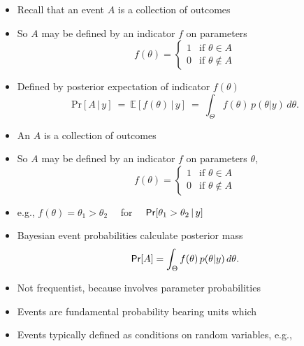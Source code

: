 \documentclass[10pt]{report}
\begin{document}
%
\begin{itemize}
\item Recall that an event $A$ is a collection of outcomes
\item So $A$ may be defined by an indicator $f$ on parameters
\[
f(\theta)
=
\begin{cases}
1 & \text{if } \theta \in A
\\
0 & \text{if } \theta \not\in A
\end{cases}
\]
\item Defined by posterior expectation of indicator $f(\theta)$
\[
\mathrm{Pr}[A \,|\, y]
\ = \
\mathbb{E}\left[ f(\theta) \, | \, y \right]
\ = \
\int_{\Theta} f(\theta) \, p(\theta|y) \, d\theta.
\]
\end{itemize}


%
\begin{itemize}
\item An  $A$ is a collection of outcomes
\item So $A$ may be defined by an indicator $f$ on parameters $\theta$,
\[
f(\theta) 
= 
\begin{cases}
1 & \text{if } \theta \in A
\\
0 & \text{if } \theta \not\in A
\end{cases}
\]
\item e.g., $f(\theta) = \theta_1 > \theta_2$ 
\ \ for \ \ $\text{\sf Pr}[\theta_1 > \theta_2 \, | \, y]$
\item Bayesian event probabilities calculate posterior mass
\[
\text{\sf Pr}[A] = \int_{\Theta} f(\theta) \, p(\theta|y) \, d\theta.
\]
\item Not frequentist, because involves parameter probabilities
\end{itemize}


%
\begin{itemize}
\item Events are fundamental probability bearing units which
\item Events typically defined as conditions on random variables, e.g.,
\end{itemize}
\end{document}
